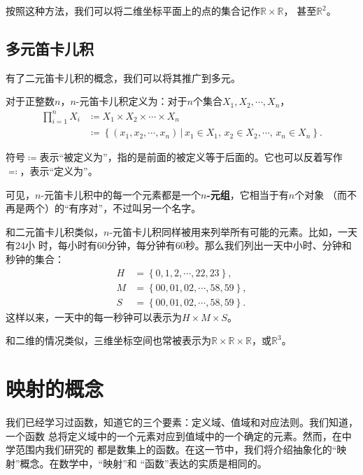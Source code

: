 按照这种方法，我们可以将二维坐标平面上的点的集合记作$\mathbb{R}\times\mathbb{R}$，
甚至$\mathbb{R}^2$。

\subsection{多元笛卡儿积}

有了二元笛卡儿积的概念，我们可以将其推广到多元。

\begin{rawdef}[$n$-元笛卡儿积]
    对于正整数$n$，$n$-元笛卡儿积定义为：对于$n$个集合$X_{1},X_{2},\cdots,X_{n}$，
    \begin{align*}
        \prod_{i=1}^n X_{i}&\coloneq X_{1}\times X_{2}\times \cdots \times X_{n} \\
                           &\coloneq \left\{ \left( x_{1},x_{2},\cdots,x_{n} 
                               \right) \,|\, x_{1} \in X_{1},\, x_{2}\in X_{2},
                           \cdots,\,x_{n}\in X_{n}\right\}.
    \end{align*}
\end{rawdef}

符号$\coloneq$表示“被定义为”，指的是前面的被定义等于后面的。它也可以反着写作
$\eqcolon$，表示“定义为”。

可见，$n$-元笛卡儿积中的每一个元素都是一个\textbf{$n$-元组}，它相当于有$n$个对象
（而不再是两个）的“有序对”，不过叫另一个名字。

和二元笛卡儿积类似，$n$-元笛卡儿积同样被用来列举所有可能的元素。比如，一天有24小
时，每小时有60分钟，每分钟有60秒。那么我们列出一天中小时、分钟和秒钟的集合：
\begin{align*}
    H &= \left\{ 0,1,2,\cdots,22,23 \right\},\\
    M &= \left\{ 00,01,02,\cdots,58,59 \right\},\\
    S &= \left\{ 00,01,02,\cdots,58,59 \right\}.
\end{align*}
这样以来，一天中的每一秒钟可以表示为$H\times M\times S$。

和二维的情况类似，三维坐标空间也常被表示为$\mathbb{R}\times\mathbb{R}
\times\mathbb{R}$，或$\mathbb{R}^3$。

\section{映射的概念}

我们已经学习过函数，知道它的三个要素：定义域、值域和对应法则。我们知道，一个函数
总将定义域中的一个元素对应到值域中的一个确定的元素。然而，在中学范围内我们研究的
都是数集上的函数。在这一节中，我们将介绍抽象化的“映射”概念。在数学中，“映射”和
“函数”表达的实质是相同的。

